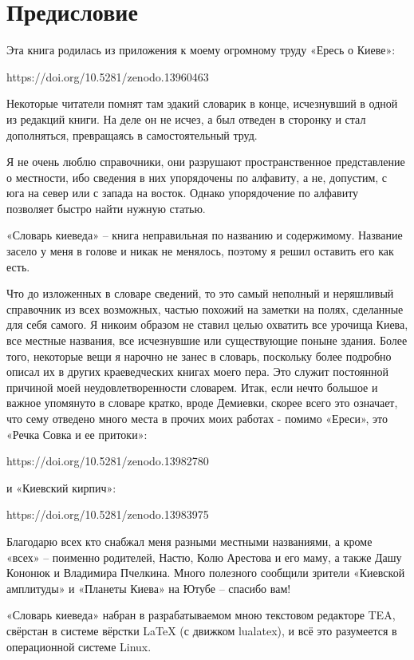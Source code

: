 \chapter*{Предисловие}

Эта книга родилась из приложения к моему огромному труду «Ересь о Киеве»:

https://doi.org/10.5281/zenodo.13960463

Некоторые читатели помнят там эдакий словарик в конце, исчезнувший в одной из редакций книги. На деле он не исчез, а был отведен в сторонку и стал дополняться, превращаясь в самостоятельный труд.

Я не очень люблю справочники, они разрушают пространственное представление о местности, ибо сведения в них упорядочены по алфавиту, а не, допустим, с юга на север или с запада на восток. Однако упорядочение по алфавиту позволяет быстро найти нужную статью.

«Словарь киеведа» – книга неправильная по названию и содержимому. Название засело у меня в голове и никак не менялось, поэтому я решил оставить его как есть. 

Что до изложенных в словаре сведений, то это самый неполный и неряшливый справочник из всех возможных, частью похожий на заметки на полях, сделанные для себя самого. Я никоим образом не ставил целью охватить все урочища Киева, все местные названия, все исчезнувшие или существующие поныне здания. Более того, некоторые вещи я нарочно не занес в словарь, поскольку более подробно описал их в других краеведческих книгах моего пера. Это служит постоянной причиной моей неудовлетворенности словарем. Итак, если нечто большое и важное упомянуто в словаре кратко, вроде Демиевки, скорее всего это означает, что сему отведено много места в прочих моих работах - помимо «Ереси», это 
«Речка Совка и ее притоки»:

https://doi.org/10.5281/zenodo.13982780

и «Киевский кирпич»:

https://doi.org/10.5281/zenodo.13983975

Благодарю всех кто снабжал меня разными местными названиями, а кроме «всех» – поименно родителей, Настю, Колю Арестова и его маму, а также Дашу Кононюк и Владимира Пчелкина. Много полезного сообщили зрители «Киевской амплитуды» и «Планеты Киева» на Ютубе – спасибо вам!

«Словарь киеведа» набран в разрабатываемом мною текстовом редакторе TEA, свёрстан в системе вёрстки LaTeX (с движком lualatex), и всё это разумеется в операционной системе Linux.

